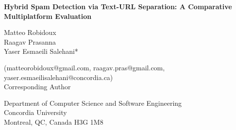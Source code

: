 \documentclass{article}
\begin{document}
\begin{titlepage}
    \centering
    \vspace*{\fill} %
    
    {\huge \textbf{Hybrid Spam Detection via Text-URL Separation: A Comparative Multiplatform Evaluation}}\\[1.5cm]
    
    \begin{large}
        Matteo Robidoux \\
        Raagav Prasanna \\
        Yaser Esmaeili Salehani* \\
    \end{large}

    \vspace{1cm}

    {\large (matteorobidoux@gmail.com, raagav.pras@gmail.com, yaser.esmaeilisalehani@concordia.ca)} \\[0.5cm]
    {\large * Corresponding Author}\\

    \vspace{1cm}

    {\large Department of Computer Science and Software Engineering}\\
    {\large Concordia University}\\
    {\large Montreal, QC, Canada H3G 1M8}\\

    \vspace{1cm}


    
    \vspace*{\fill} %
\end{titlepage}
\end{document}
